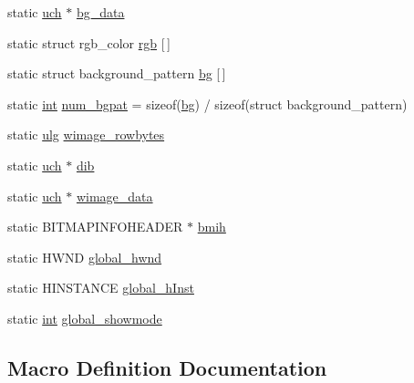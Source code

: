 \begin{DoxyCompactItemize}
\item 
static \mbox{\hyperlink{readpng_8h_af3307af5922c72924a837559c801a8a4}{uch}} $\ast$ \mbox{\hyperlink{rpng2-win_8c_ae7b1caf5caf0f274b142e9792622dac4}{bg\+\_\+data}}
\item 
static struct rgb\+\_\+color \mbox{\hyperlink{rpng2-win_8c_a3640ea0c70d52a4d9bb9b79008e91dc5}{rgb}} \mbox{[}$\,$\mbox{]}
\item 
static struct background\+\_\+pattern \mbox{\hyperlink{rpng2-win_8c_a808fa6d3573a86afa3ba7698a65b1ef6}{bg}} \mbox{[}$\,$\mbox{]}
\item 
static \mbox{\hyperlink{ioapi_8h_a787fa3cf048117ba7123753c1e74fcd6}{int}} \mbox{\hyperlink{rpng2-win_8c_af61b351338b26840386fbab7f8214e53}{num\+\_\+bgpat}} = sizeof(\mbox{\hyperlink{rpng2-x_8c_a808fa6d3573a86afa3ba7698a65b1ef6}{bg}}) / sizeof(struct background\+\_\+pattern)
\item 
static \mbox{\hyperlink{readpng_8h_abd6f60bf9450af2ecb94097a32c19a64}{ulg}} \mbox{\hyperlink{rpng2-win_8c_a833a12713a1ba96549815e6be283c60d}{wimage\+\_\+rowbytes}}
\item 
static \mbox{\hyperlink{readpng_8h_af3307af5922c72924a837559c801a8a4}{uch}} $\ast$ \mbox{\hyperlink{rpng2-win_8c_acdb146e25444af1717231691767569e6}{dib}}
\item 
static \mbox{\hyperlink{readpng_8h_af3307af5922c72924a837559c801a8a4}{uch}} $\ast$ \mbox{\hyperlink{rpng2-win_8c_affd0519131c0b49596c378a425794a73}{wimage\+\_\+data}}
\item 
static B\+I\+T\+M\+A\+P\+I\+N\+F\+O\+H\+E\+A\+D\+ER $\ast$ \mbox{\hyperlink{rpng2-win_8c_ae1b9f23932d01edb52ba2d35517d4964}{bmih}}
\item 
static H\+W\+ND \mbox{\hyperlink{rpng2-win_8c_a94f16b99a35a2bd832ce3081c480746d}{global\+\_\+hwnd}}
\item 
static H\+I\+N\+S\+T\+A\+N\+CE \mbox{\hyperlink{rpng2-win_8c_a0822b8db84e542f5182b6b45c90e454c}{global\+\_\+h\+Inst}}
\item 
static \mbox{\hyperlink{ioapi_8h_a787fa3cf048117ba7123753c1e74fcd6}{int}} \mbox{\hyperlink{rpng2-win_8c_a003cfd2e01926982fec6d2269f5aabc6}{global\+\_\+showmode}}
\end{DoxyCompactItemize}


\subsection{Macro Definition Documentation}
\mbox{\label{rpng2-win_8c_ae2f08dc603ae93c402abd918ba4e23e1}} 
